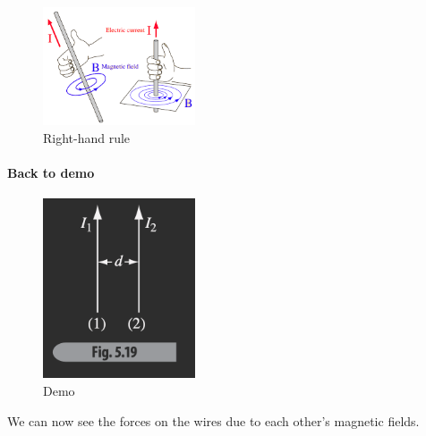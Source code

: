 \documentclass[../main.tex]{subfiles}
\begin{document}
\begin{figure}[ht]
    \centering
    \includegraphics[width=0.4\textwidth]{finger.png}
    \caption{Right-hand rule}
    \label{fig:finger}
\end{figure}

\paragraph{Back to demo}
\begin{figure}[ht]
    \centering
    \includegraphics[width=0.4\textwidth]{fig5_19.png}
    \caption{Demo}
    \label{fig:fig5_19}
\end{figure}
We can now see the forces on the wires due to each other's magnetic fields.
\end{document}

